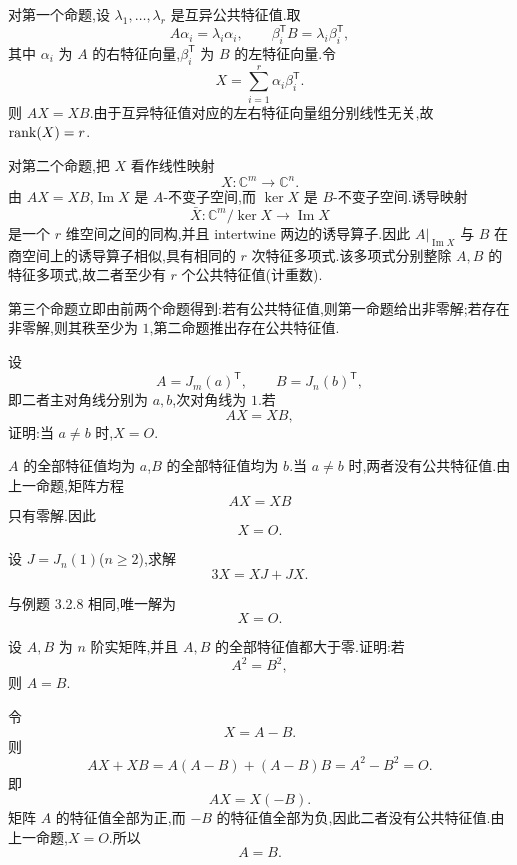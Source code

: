 \begin{solution}
对第一个命题,设 $\lambda_1,\ldots,\lambda_r$ 是互异公共特征值.取
\[
A\alpha_i=\lambda_i\alpha_i,
\qquad
\beta_i^{\mathsf T}B=\lambda_i\beta_i^{\mathsf T},
\]
其中 $\alpha_i$ 为 $A$ 的右特征向量,$\beta_i^{\mathsf T}$ 为 $B$ 的左特征向量.令
\[
X=\sum\limits_{i=1}^{r}\alpha_i\beta_i^{\mathsf T}.
\]
则 $AX=XB$.由于互异特征值对应的左右特征向量组分别线性无关,故 $\operatorname{rank}(X)=r$.

对第二个命题,把 $X$ 看作线性映射
\[
X:\mathbb{C}^m\longrightarrow\mathbb{C}^n.
\]
由 $AX=XB$,$\operatorname{Im}X$ 是 $A$-不变子空间,而 $\ker X$ 是 $B$-不变子空间.诱导映射
\[
\bar X:\mathbb{C}^m/\ker X\longrightarrow\operatorname{Im}X
\]
是一个 $r$ 维空间之间的同构,并且 intertwine 两边的诱导算子.因此 $A|_{\operatorname{Im}X}$ 与 $B$ 在商空间上的诱导算子相似,具有相同的 $r$ 次特征多项式.该多项式分别整除 $A,B$ 的特征多项式,故二者至少有 $r$ 个公共特征值(计重数).

第三个命题立即由前两个命题得到:若有公共特征值,则第一命题给出非零解;若存在非零解,则其秩至少为 $1$,第二命题推出存在公共特征值.
\end{solution}

\begin{example}
设
\[
A=J_m(a)^{\mathsf T},
\qquad
B=J_n(b)^{\mathsf T},
\]
即二者主对角线分别为 $a,b$,次对角线为 $1$.若
\[
AX=XB,
\]
证明:当 $a\neq b$ 时,$X=O$.
\end{example}
\exampleblank

\begin{solution}
$A$ 的全部特征值均为 $a$,$B$ 的全部特征值均为 $b$.当 $a\neq b$ 时,两者没有公共特征值.由上一命题,矩阵方程
\[
AX=XB
\]
只有零解.因此
\[
\boxed{X=O}.
\]
\end{solution}

\begin{example}
设 $J=J_n(1)$($n\geq2$),求解
\[
3X=XJ+JX.
\]
\end{example}
\exampleblank

\begin{solution}
与例题 3.2.8 相同,唯一解为
\[
\boxed{X=O}.
\]
\end{solution}

\begin{example}
设 $A,B$ 为 $n$ 阶实矩阵,并且 $A,B$ 的全部特征值都大于零.证明:若
\[
A^2=B^2,
\]
则 $A=B$.
\end{example}
\exampleblank

\begin{solution}
令
\[
X=A-B.
\]
则
\[
AX+XB
=A(A-B)+(A-B)B
=A^2-B^2=O.
\]
即
\[
AX=X(-B).
\]
矩阵 $A$ 的特征值全部为正,而 $-B$ 的特征值全部为负,因此二者没有公共特征值.由上一命题,$X=O$.所以
\[
\boxed{A=B}.
\]
\end{solution}

